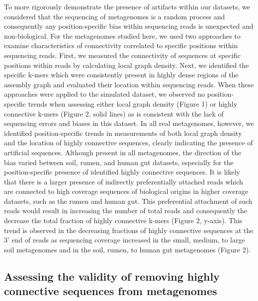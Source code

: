 \documentclass[10pt]{article}
\begin{document}
To more rigorously demonstrate the presence of artifacts within our datasets, we considered that the sequencing of metagenomes is a random process and consequently any position-specific bias within sequencing reads is unexpected and non-biological.   For the metagenomes studied here, we used two approaches to examine characteristics of connectivity correlated to specific positions within sequencing reads.  First, we measured the connectivity of sequences at specific positions within reads by calculating local graph density.  Next, we identified the specific k-mers which were consistently present in highly dense regions of the assembly graph and evaluated their location within sequencing reads.  When these approaches were applied to the simulated dataset, we observed no position-specific trends when assessing either local graph density (Figure 1) or highly connective k-mers (Figure 2, solid lines) as is consistent with the lack of sequencing errors and biases in this dataset.  In all real metagenomes, however, we identified position-specific trends in measurements of both local graph density and the location of highly connective sequences, clearly indicating the presence of artificial sequences.  Although present in all metagenomes, the direction of the bias varied between soil, rumen, and human gut datasets, especially for the position-specific presence of identified highly connective sequences.  It is likely that there is a larger presence of indirectly preferentially attached reads which are connected to high coverage sequences of biological origins in higher coverage datasets, such as the rumen and human gut.  This preferential attachment of such reads would result in increasing the number of total reads and consequently the decrease the total fraction of highly connective k-mers (Figure 2, y-axis).  This trend is observed in the decreasing fractions of highly connective sequences at the 3' end of reads as sequencing coverage increased in the small, medium, to large soil metagenomes and in the soil, rumen, to human gut metagenomes (Figure 2).

\subsection*{Assessing the validity of removing highly connective sequences from metagenomes}
\end{document}

